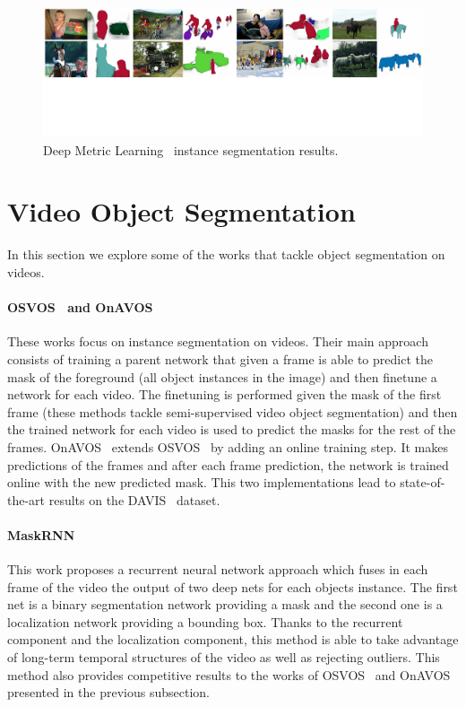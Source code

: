 \begin{figure}[h]
  \centering
  \includegraphics[width=1.\linewidth]{figures/deep_metric_learning/mask_classification.pdf}
  \caption{Deep Metric Learning~\deepml{} instance segmentation results. }
  \label{fig:deep_metric_learning}
\end{figure}

\section{Video Object Segmentation}
\label{sec:soa:videoobjectsegmentation}

In this section we explore some of the works that tackle object segmentation on videos.

\paragraph{OSVOS~\osvos{} and OnAVOS~\onavos{}}
These works focus on instance segmentation on videos.
Their main approach consists of training a parent network that given a frame is able to predict the mask of the foreground (all object instances in the image) and then finetune a network for each video.
The finetuning is performed given the mask of the first frame (these methods tackle semi-supervised video object segmentation) and then the trained network for each video is used to predict the masks for the rest of the frames.
OnAVOS~\onavos{} extends OSVOS~\osvos{} by adding an online training step.
It makes predictions of the frames and after each frame prediction, the network is trained online with the new predicted mask.
This two implementations lead to state-of-the-art results on the DAVIS~\davisboth{} dataset.

\paragraph{MaskRNN~\maskrnn{}}
This work proposes a recurrent neural network approach which fuses in each frame of the video the output of two deep nets for each objects instance.
The first net is a binary segmentation network providing a mask and the second one is a localization network providing a bounding box.
Thanks to the recurrent component and the localization component, this method is able to take advantage of long-term temporal structures of the video as well as rejecting outliers.
This method also provides competitive results to the works of OSVOS~\osvos{} and OnAVOS~\onavos{} presented in the previous subsection.
